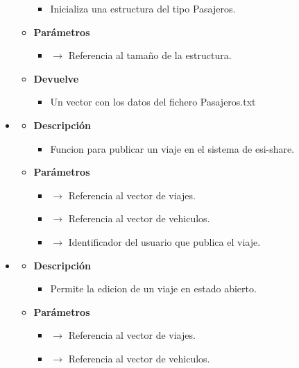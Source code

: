 \begin{itemize}
\begin{itemize}
\begin{itemize}
			\item Inicializa una estructura del tipo Pasajeros.
		\end{itemize}
		\item \textbf{Parámetros}
		\begin{itemize}
			\item {} $\rightarrow$ Referencia al tamaño de la estructura.
		\end{itemize}
		\item \textbf{Devuelve}
		\begin{itemize}
			\item Un vector con los datos del fichero Pasajeros.txt
		\end{itemize}
	\end{itemize}
    \item {}
    \begin{itemize}
        \item \textbf{Descripción}
        \begin{itemize}
			\item Funcion para publicar un viaje en el sistema de esi-share.
		\end{itemize}
		\item \textbf{Parámetros}
		\begin{itemize}
			\item {}  $\rightarrow$ Referencia al vector de viajes.
            \item {} $\rightarrow$ Referencia al vector de vehiculos.
            \item {} $\rightarrow$ Identificador del usuario que publica el viaje.
		\end{itemize}
	\end{itemize}
    \item {}
    \begin{itemize}
        \item \textbf{Descripción}
        \begin{itemize}
			\item  Permite la edicion de un viaje en estado abierto.
		\end{itemize}
		\item \textbf{Parámetros}
		\begin{itemize}
			\item {}  $\rightarrow$ Referencia al vector de viajes.
            \item {} $\rightarrow$ Referencia al vector de vehiculos.

\end{itemize}
\end{itemize}
\end{itemize}
